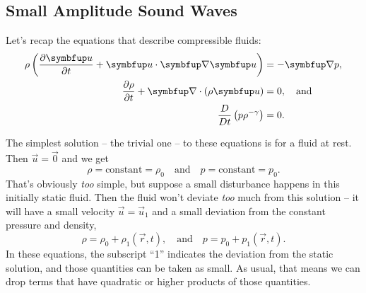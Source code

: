 
\subsection{Small Amplitude Sound Waves}

Let's recap the equations that describe compressible fluids:
\begin{align*}
\rho \left( \dfdx{\vec{u}}{t} + \vec{u} \cdot \grad \vec{u} \right) & =  -\grad p, \\
\frac{\partial \rho}{\partial t} + \vec{\nabla} \cdot (\rho \vec{u} ) &  = 0,\quad  \text{and} \\
\frac{D}{Dt} \left( p \rho^{-\gamma} \right) & =  0.
\end{align*}

The simplest solution -- the trivial one -- to these equations is for a fluid at rest.  Then $\vec{u} = \vec{0}$ and we get
\[
\rho = \text{constant} = \rho_0 \quad \text{and} \quad p = \text{constant} = p_0.
\]
That's obviously \emph{too} simple, but suppose a small disturbance happens in this initially static fluid.  Then the fluid won't deviate \emph{too} much from this solution -- it will have a small velocity $\vec{u} = \vec{u}_1$ and a small deviation from the constant pressure and density,
\begin{equation}
\rho = \rho_0 + \rho_1(\vec{r}, t), \quad \text{and} \quad p = p_0 + p_1(\vec{r}, t).
\end{equation}
In these equations, the subscript ``1'' indicates the deviation from the static solution, and those quantities can be taken as small.  As usual, that means we can drop terms that have quadratic or higher products of those quantities.


